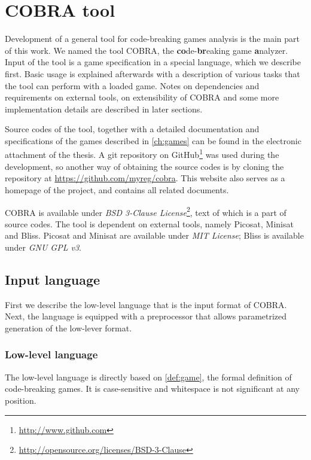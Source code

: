 \chapter{COBRA tool}
\label{ch:cobra}
Development of a general tool for
  code-breaking games analysis is the main part of this work.
We named the tool COBRA, the \textbf{co}de-\textbf{br}eaking game \textbf{a}nalyzer.
Input of the tool is a game specification in a special language, which
  we describe first.
Basic usage is explained afterwards with
  a description of various tasks that the tool can perform with a loaded game.
Notes on dependencies and requirements on external tools,
  on extensibility of COBRA and
  some more implementation details
  are described in later sections.

Source codes of the tool, together with a detailed documentation
  and specifications of the games described in \autoref{ch:games}
  can be found in the electronic attachment of the thesis.
A git repository on GitHub\footnote{\url{http://www.github.com}}
  was used during the development,
  so another way of obtaining the source codes is by cloning
  the repository at \url{https://github.com/myreg/cobra}.
This website also serves as a homepage of the project, and contains
  all related documents.

COBRA is available under \emph{BSD 3-Clause License}\footnote{\url{http://opensource.org/licenses/BSD-3-Clause}},
  text of which is a part of source codes.
The tool is dependent on external tools, namely Picosat, Minisat and Bliss.
Picosat and Minisat are available under \emph{MIT License};
Bliss is available under \emph{GNU GPL v3}.

\section{Input language} \label{sec:lng}

First we describe the low-level language that is the input format of COBRA.
Next, the language is equipped with a preprocessor that allows
  parametrized generation of the low-lever format.

\subsection{Low-level language}

The low-level language is directly based on \autoref{def:game}, the formal definition of
  code-breaking games.
It is case-sensitive and whitespace is not significant at any position.

